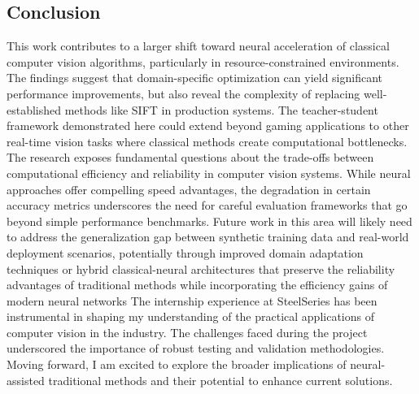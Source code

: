 \subsection{Conclusion}
This work contributes to a larger shift toward neural acceleration of classical computer vision algorithms, particularly in resource-constrained environments. The findings suggest that domain-specific optimization can yield significant performance improvements, but also reveal the complexity of replacing well-established methods like SIFT in production systems. The teacher-student framework demonstrated here could extend beyond gaming applications to other real-time vision tasks where classical methods create computational bottlenecks.
The research exposes fundamental questions about the trade-offs between computational efficiency and reliability in computer vision systems. While neural approaches offer compelling speed advantages, the degradation in certain accuracy metrics underscores the need for careful evaluation frameworks that go beyond simple performance benchmarks. Future work in this area will likely need to address the generalization gap between synthetic training data and real-world deployment scenarios, potentially through improved domain adaptation techniques or hybrid classical-neural architectures that preserve the reliability advantages of traditional methods while incorporating the efficiency gains of modern neural networks
The internship experience at SteelSeries has been instrumental in shaping my understanding of the practical applications of computer vision in the industry. The challenges faced during the project underscored the importance of robust testing and validation methodologies. Moving forward, I am excited to explore the broader implications of neural-assisted traditional methods and their potential to enhance current solutions.
